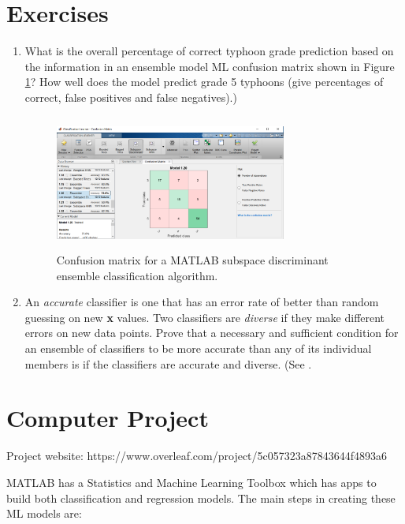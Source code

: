 \documentclass{SBCbookchapter}
\begin{document}
	\newpage
	
	\section{Exercises}  
	
	\begin{enumerate}
		\item What is the overall percentage of correct typhoon grade prediction based on the information in an ensemble model ML confusion matrix shown in Figure \ref{EnsembleClass}? How well does the model predict grade 5 typhoons (give percentages of correct, false positives and false negatives).)
		\begin{figure}[!htpb]
			\centering
			\includegraphics[width=3in,height=1.75in]{Ensemblefig1.png}
			\caption{Confusion matrix for a MATLAB subspace discriminant ensemble classification algorithm.}
			\label{EnsembleClass}
		\end{figure}
		
		\item An \emph{accurate} classifier is one that has an
		error rate of better than random guessing on new {\bf x} values. Two classifiers are \emph{diverse} if they make different errors on new data points. Prove that a necessary and sufficient condition for an ensemble of classifiers to be more
		accurate than any of its individual members is if the classifiers are accurate and
		diverse. (See \cite{Hansen}.
		
		
	\end{enumerate}
	\newpage
	\section{Computer Project}
	{\flushleft Project website: 
		https://www.overleaf.com/project/5c057323a87843644f4893a6}
	
	
	MATLAB has a Statistics and Machine Learning Toolbox which has apps to build both classification and regression models.  The main steps in creating these ML models are:
	
\end{document}
